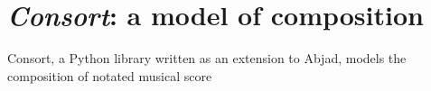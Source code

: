 \chapter{\emph{Consort}: a model of composition}
\label{chap:a-model-of-composition}



\begin{comment}
<abjad>[hide=true]
import collections
import consort
</abjad>
\end{comment}

\begin{comment}
\begin{markdown}
-   Materials
-   Configuration
-   Templating
-   Layers
-   Coarse to fine
-   Rhythm first
-   What is specification? What is a specifier? What is configuration and
    aggregation?
-   What should happen musically, where should it happen?
-   What is material?
-   What is music?
-   Rhythm is interpreted first, as all other parameters depend on it.
-   Rhythm is interpreted from "coarse" to "fine": from the level of phrase
    boundaries to the level of individual notes, rests, tuplets and ties.
-   This discussion only focuses on notation, nothing related to aesthetic
    experience, physical modeling or anything else. This is a tool for a
    specific composer to create scores, not a discussion explicitly of why they
    would work this way (although that should be discussed in the conclusion).
-   Specification and interpretation conceive of the score as a single, hugely
    complex expression.
-   Templating as variation.
-   Define what composition means here: laying out symbols on the page.
-   This way of thinking and working does not attempt to define or even model
    concepts like "melody" or even "phrase". They're too vague. If we use that
    terminology at all, it is only in the most incredibly constrained way.
\end{markdown}
\end{comment}

Consort, a Python library written as an extension to Abjad, models the
composition of notated musical score

